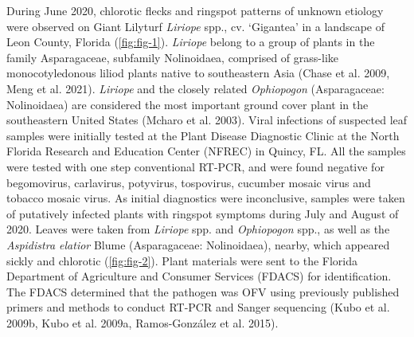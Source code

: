 \documentclass[12pt,final,CPage]{ufthesis}
\begin{document}
{  During June 2020, chlorotic flecks and ringspot patterns of unknown etiology were observed on Giant Lilyturf \emph{Liriope} spp., cv. `Gigantea' in a landscape of Leon County, Florida (\ref{fig:fig-1}). \emph{Liriope} belong to a group of plants in the family Asparagaceae, subfamily Nolinoidaea, comprised of grass-like monocotyledonous liliod plants native to southeastern Asia (Chase et al. 2009, Meng et al. 2021). \emph{Liriope} and the closely related \emph{Ophiopogon} (Asparagaceae: Nolinoidaea) are considered the most important ground cover plant in the southeastern United States (Mcharo et al. 2003). Viral infections of suspected leaf samples were initially tested at the Plant Disease Diagnostic Clinic at the North Florida Research and Education Center (NFREC) in Quincy, FL. All the samples were tested with one step conventional RT-PCR, and were found negative for begomovirus, carlavirus, potyvirus, tospovirus, cucumber mosaic virus and tobacco mosaic virus. As initial diagnostics were inconclusive, samples were taken of putatively infected plants with ringspot symptoms during July and August of 2020. Leaves were taken from \emph{Liriope} spp. and \emph{Ophiopogon} spp., as well as the \emph{Aspidistra elatior} Blume (Asparagaceae: Nolinoidaea), nearby, which appeared sickly and chlorotic (\ref{fig:fig-2}). Plant materials were sent to the Florida Department of Agriculture and Consumer Services (FDACS) for identification. The FDACS determined that the pathogen was OFV using previously published primers and methods to conduct RT-PCR and Sanger sequencing (Kubo et al. 2009b, Kubo et al. 2009a, Ramos-González et al. 2015).
}
\end{document}
